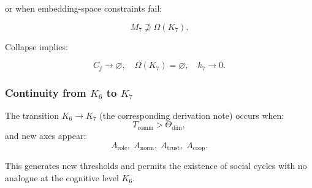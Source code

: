 or when embedding-space constraints fail:

\[
 M_7 \not\supseteq \Omega(K_7).
\]

Collapse implies:

\[
 C_j \to \varnothing,\quad
 \Omega(K_7)=\varnothing,\quad
 k_7\to 0.
\]

\subsubsection{Continuity from \texorpdfstring{$K_6$}{K_6} to \texorpdfstring{$K_7$}{K_7}}

The transition $K_6\to K_7$ (the corresponding derivation note) occurs when:
\[
  T_{\mathrm{comm}} > \Theta_{\mathrm{dim}},
\]
and new axes appear:
\[
  A_{\mathrm{role}},\;
  A_{\mathrm{norm}},\;
  A_{\mathrm{trust}},\;
  A_{\mathrm{coop}}.
\]

This generates new thresholds and permits the existence of social cycles
with no analogue at the cognitive level $K_6$.

